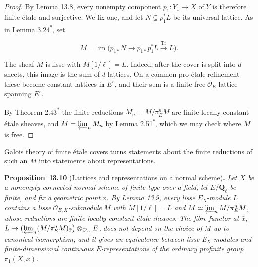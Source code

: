 \documentclass[11pt]{article}
\newenvironment{bpstatement}[2]{\par\addvspace{0.6\baselineskip}\noindent\textbf{#1}#2\textbf{.}\enspace\ignorespaces}
  {\par\addvspace{0.4\baselineskip}}
\newenvironment{bpstatementit}[2]{\begin{bpstatement}{#1}{#2}\itshape\ignorespaces}{\end{bpstatement}}
\newcommand{\bpout}[1]{#1\textsuperscript{\hyperlink{bp-outside}{\ensuremath{\ast}}}}
\begin{document}
\begin{proof}[{Proof}]
By Lemma \hyperref[bp26]{13.8}, every nonempty component \(p_1:Y_1\to X\) of \(Y\) is therefore finite étale and surjective. We fix one, and let \(N\subseteq p_1^*L\) be its universal lattice. As in Lemma \bpout{3.24}, set

\[
M=\operatorname{im}\bigl(
p_{1*}N\longrightarrow p_{1*}p_1^*L
\xrightarrow{\operatorname{Tr}}L\bigr).
\]

The sheaf \(M\) is lisse with \(M[1/\ell]=L\). Indeed, after the cover is split into \(d\) sheets, this image is the sum of \(d\) lattices. On a common pro-étale refinement these become constant lattices in \(E^r\), and their sum is a finite free \(\mathcal O_E\)-lattice spanning \(E^r\).

By Theorem \bpout{2.43} the finite reductions \(M_n=M/\pi_E^nM\) are finite locally constant étale sheaves, and \(M=\varprojlim_nM_n\) by Lemma \bpout{2.51}, which we may check where \(M\) is free.
\end{proof}

\label{bp31}%
Galois theory of finite étale covers turns statements about the finite reductions of such an \(M\) into statements about representations.

\label{bp32}%
\begin{bpstatementit}{Proposition~13.10}{ (Lattices and representations on a normal scheme)}
Let \(X\) be a nonempty connected normal scheme of finite type over a field, let \(E/\mathbf Q_\ell\) be finite, and fix a geometric point \(\bar x\). By Lemma \hyperref[bp29]{13.9}, every lisse \(E_X\)-module \(L\) contains a lisse \(\mathcal O_{E,X}\)-submodule \(M\) with \(M[1/\ell]=L\) and \(M\simeq\varprojlim_nM/\pi_E^nM\), whose reductions are finite locally constant étale sheaves. The fibre functor at \(\bar x\), \(L\mapsto\bigl(\varprojlim_n(M/\pi_E^nM)_{\bar x}\bigr)\otimes_{\mathcal O_E}E\), does not depend on the choice of \(M\) up to canonical isomorphism, and it gives an equivalence between lisse \(E_X\)-modules and finite-dimensional continuous \(E\)-representations of the ordinary profinite group \(\pi_1(X,\bar x)\).
\end{bpstatementit}
\end{document}

